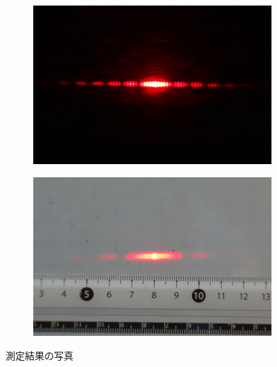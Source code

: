 \begin{figure}[htbp]
\begin{minipage}[ht]{0.48\hsize}
		\label{subfig:ds2_screen}
	\end{minipage}
\end{figure}
\begin{figure}[htbp]
	\centering
	\addtocounter{figure}{-1}
	\begin{subfigure}{0.48\hsize}
		\addtocounter{subfigure}{6}\centering
		\includegraphics[width=\linewidth]{src/figures/result/DS3.JPG}
		\label{subfig:ds3_screen}
	\end{subfigure}
	\begin{subfigure}{0.48\hsize}\centering
		\includegraphics[width=\linewidth]{src/figures/result/measure.JPG}
		\label{subfig:screen_measure}
	\end{subfigure}
	\caption{測定結果の写真}\label{fig:screen_photo}
\end{figure}
